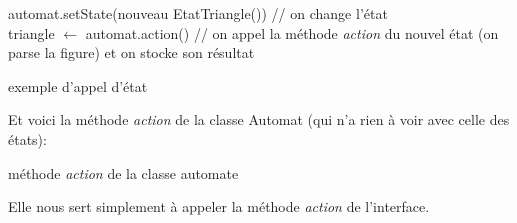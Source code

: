 \documentclass[../../Rapport RayTracer]{subfiles}
\begin{document}
 \begin{algorithm}[H]
	\DontPrintSemicolon
	automat.setState(nouveau EtatTriangle()) // on change l'état
	\hfill\\
	triangle $\gets$ automat.action() // on appel la méthode \textit{action} du nouvel état (on parse la figure) et on stocke son résultat

	\caption{exemple d'appel d'état}
	\label{exempleState}
\end{algorithm}

Et voici la méthode \textit{action} de la classe Automat (qui n'a rien à voir avec celle des états):
 
  \begin{algorithm}[H]
	\DontPrintSemicolon
	\caption{méthode \textit{action} de la classe automate}
	\label{exempleState}
\end{algorithm}
 
Elle nous sert simplement à appeler la méthode \textit{action} de l'interface.
\end{document}

